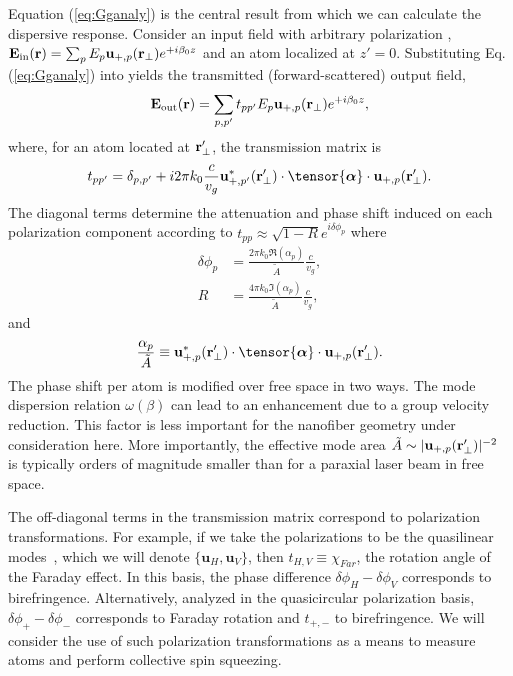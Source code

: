 \documentclass[preprint,aps,pra,onecolumn]{revtex4-1} %
\newcommand{\inp}{{\rm in}}
\newcommand{\out}{{\rm out}}
\begin{document}
Equation (\ref{eq:Gganaly}) is the central result from which we can calculate the dispersive response.  
Consider an input field with arbitrary polarization , $\mathbf{E}_{\inp}(\br) = \sum_p E_p 
\mathbf{u}_{+,p}(\br_\perp) e^{+i \beta_0 z}$ and an atom localized at $z'=0$.  Substituting Eq. 
(\ref{eq:Gganaly}) into  yields the transmitted (forward-scattered) output field, 
\begin{equation}
\mathbf{E}_{\out}(\br) =  \sum_{p,p'} t_{pp'} E_p \mathbf{u}_{+, p}(\br_\perp) e^{+i \beta_0 z}, 
\end{equation}
where, for an atom located at $\mathbf{r}'_\perp$, the transmission matrix is
\begin{equation}
t_{pp'} = \delta_{p,p'} + i 2\pi k_0 \frac{c}{v_g}\mathbf{u}^*_{+, p'}(\br'_\perp) \cdot 
\tensor{\boldsymbol{\alpha}} \cdot \mathbf{u}_{+, p}(\br'_\perp) .
\end{equation}
The diagonal terms determine the attenuation and phase shift induced on each polarization component 
according to $t_{p p} \approx \sqrt{1-R}e^{i \delta \phi_p}$ where
\begin{align}
\delta \phi_p &= \frac{2 \pi k_0 \Re(\alpha_p) }{\tilde{A}} \frac{c}{v_g}, \\
R &=  \frac{4 \pi k_0 \Im(\alpha_p) }{\tilde{A}} \frac{c}{v_g},
\label{phaseshift} 
\end{align}
and 
\begin{equation}
 \frac{\alpha_p}{\tilde{A}} \equiv \mathbf{u}^*_{+,p}(\br'_\perp) \cdot \tensor{\boldsymbol{\alpha}}\cdot 
 \mathbf{u}_{+, p}(\br'_\perp). 
 \end{equation}
 The phase shift per atom is modified over free space in two ways.  The mode dispersion relation 
 $\omega(\beta)$ can lead to an enhancement due to a group velocity reduction. This factor is less 
 important for the nanofiber geometry under consideration here.  More importantly, the effective mode 
 area $\tilde{A} \sim |\mathbf{u}_{+,p}(\mathbf{r}'_\perp)|^{-2}$ is typically orders of magnitude smaller than 
 for a paraxial laser beam in free space.  
 
 The off-diagonal terms in the transmission matrix correspond to polarization transformations.  For 
 example, if we take the polarizations to be the quasilinear modes~\cite{?}, which we will denote $\{ 
 \mathbf{u}_{H}, \mathbf{u}_{V}\}$, then $t_{H,V} \equiv \chi_{Far}$,  the rotation angle of the Faraday 
 effect.  In this basis, the phase difference $\delta  \phi_H - \delta \phi_V$ corresponds to birefringence.  
 Alternatively, analyzed in the quasicircular polarization basis, $\delta \phi_+ -\delta  \phi_-$ corresponds 
 to Faraday rotation and $t_{+,-}$ to birefringence.  We will consider the use of such polarization 
 transformations as a means to measure atoms and perform collective spin squeezing.
\end{document}
